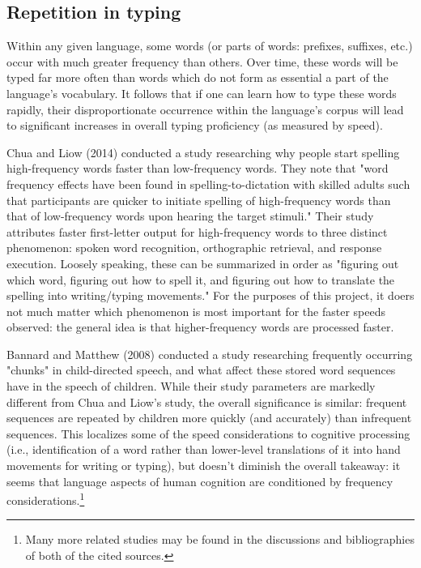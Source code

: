 \documentclass[11pt]{article}
\begin{document}
\subsection{Repetition in typing}
\label{sec:org07a30f7}

Within any given language, some words (or parts of words: prefixes, suffixes, etc.) occur with much greater frequency than others. Over time, these words will be typed far more often than words which do not form as essential a part of the language's vocabulary. It follows that if one can learn how to type these words rapidly, their disproportionate occurrence within the language's corpus will lead to significant increases in overall typing proficiency (as measured by speed).

Chua and Liow (2014) conducted a study researching why people start spelling high-frequency words faster than low-frequency words. They note that "word frequency effects have been found in spelling-to-dictation with skilled adults such that participants are quicker to initiate spelling of high-frequency words than that of low-frequency words upon hearing the target stimuli." Their study attributes faster first-letter output for high-frequency words to three distinct phenomenon: spoken word recognition, orthographic retrieval, and response execution. Loosely speaking, these can be summarized in order as "figuring out which word, figuring out how to spell it, and figuring out how to translate the spelling into writing/typing movements." For the purposes of this project, it doers not much matter which phenomenon is most important for the faster speeds observed: the general idea is that higher-frequency words are processed faster.

Bannard and Matthew (2008) conducted a study researching frequently occurring "chunks" in child-directed speech, and what affect these stored word sequences have in the speech of children. While their study parameters are markedly different from Chua and Liow's study, the overall significance is similar: frequent sequences are repeated by children more quickly (and accurately) than infrequent sequences. This localizes some of the speed considerations to cognitive processing (i.e., identification of a word rather than lower-level translations of it into hand movements for writing or typing), but doesn't diminish the overall takeaway: it seems that language aspects of human cognition are conditioned by frequency considerations.\footnote{Many more related studies may be found in the discussions and bibliographies of both of the cited sources.}
\end{document}
